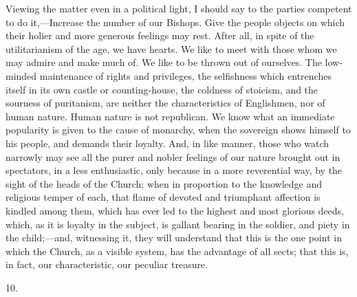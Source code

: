 Viewing the matter even in a political light, I
should say to the parties competent to do it,—Increase the number of
our Bishops. Give the people objects on which their holier and more
generous feelings may rest. After all, in spite of the utilitarianism
of the age, we have hearts. We like to meet with those whom we may
admire and make much of. We like to be thrown out of ourselves. The
low-minded maintenance of rights and privileges, the selfishness which
entrenches itself in its own castle or counting-house, the coldness of
stoicism, and the sourness of puritanism, are neither the
characteristics of Englishmen, nor of human nature. Human nature is
not republican. We know what an immediate popularity is given to the
cause of monarchy, when the sovereign shows himself to his
people, and demands their loyalty. And, in like manner, those who
watch narrowly may see all the purer and nobler feelings of our nature
brought out in spectators, in a less enthusiastic, only because in a
more reverential way, by the sight of the heads of the Church; when in
proportion to the knowledge and religious temper of each, that flame
of devoted and triumphant affection is kindled among them, which has
ever led to the highest and most glorious deeds, which, as it is
loyalty in the subject, is gallant bearing in the soldier, and piety
in the child;—and, witnessing it, they will understand that this is
the one point in which the Church, as a visible system, has the
advantage of all sects; that this is, in fact, our characteristic, our
peculiar treasure.

10.

